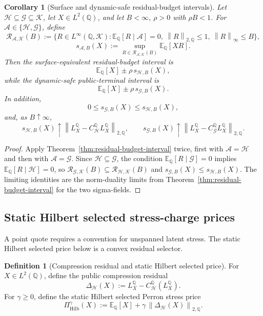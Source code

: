 \documentclass[11pt,a4paper]{amsart}
\theoremstyle{plain}
\newtheorem{corollary}[theorem]{Corollary}
\theoremstyle{definition}
\newtheorem{definition}[theorem]{Definition}
\theoremstyle{remark}
\newcommand{\QQ}{\mathbb{Q}}
\newcommand{\EE}{\mathbb{E}}
\newcommand{\cA}{\mathcal{A}}
\newcommand{\cG}{\mathcal{G}}
\newcommand{\cH}{\mathcal{H}}
\newcommand{\cK}{\mathcal{K}}
\newcommand{\cR}{\mathcal{R}}
\newcommand{\norm}[1]{\left\lVert #1\right\rVert}
\begin{document}
\begin{corollary}[Surface and dynamic-safe residual-budget intervals]\label{thm:nested-residual-budget-intervals}
Let \(\cH\subseteq\cG\subseteq\cK\), let \(X\in L^2(\QQ)\), and let \(B<\infty\), \(\rho>0\) with
\(\rho B<1\).  For \(\cA\in\{\cH,\cG\}\), define
\[
        \cR_{\cA,\cK}(B)
        :=
        \{R\in L^\infty(\QQ,\cK):
        \EE_\QQ[R\mid\cA]=0,\ 
        \norm{R}_{2,\QQ}\le1,\ 
        \norm{R}_\infty\le B\},
\]
\[
        s_{\cA,B}(X)
        :=
        \sup_{R\in\cR_{\cA,\cK}(B)}\EE_\QQ[XR].
\]
Then the surface-equivalent residual-budget interval is
\[
        \EE_\QQ[X]\pm \rho\,s_{\cH,B}(X),
\]
while the dynamic-safe public-terminal interval is
\[
        \EE_\QQ[X]\pm \rho\,s_{\cG,B}(X).
\]
In addition,
\[
        0\le s_{\cG,B}(X)\le s_{\cH,B}(X),
\]
and, as \(B\uparrow\infty\),
\[
        s_{\cH,B}(X)\uparrow
        \norm{L_X^\QQ-C_{\cH}^{\QQ}L_X^\QQ}_{2,\QQ},
        \qquad
        s_{\cG,B}(X)\uparrow
        \norm{L_X^\QQ-C_{\cG}^{\QQ}L_X^\QQ}_{2,\QQ}.
\]
\end{corollary}

\begin{proof}
Apply Theorem~\ref{thm:residual-budget-interval} twice, first with \(\cA=\cH\) and then with
\(\cA=\cG\).  Since \(\cH\subseteq\cG\), the condition \(\EE_\QQ[R\mid\cG]=0\) implies
\(\EE_\QQ[R\mid\cH]=0\), so \(\cR_{\cG,\cK}(B)\subseteq\cR_{\cH,\cK}(B)\) and
\(s_{\cG,B}(X)\le s_{\cH,B}(X)\).  The limiting identities are the norm-duality limits from
Theorem~\ref{thm:residual-budget-interval} for the two sigma-fields.
\end{proof}

\subsection{Static Hilbert selected stress-charge prices}

A point quote requires a convention for unspanned latent stress.  The static Hilbert selected
price below is a convex residual selector.

\begin{definition}[Compression residual and static Hilbert selected price]\label{def:hilbert-selected-price}
For \(X\in L^2(\QQ)\), define the public compression residual
\[
        \Delta_{\cH}(X)
        :=
        L_X^\QQ-C_{\cH}^{\QQ}(L_X^\QQ).
\]
For \(\gamma\ge0\), define the static Hilbert selected Perron stress price
\[
        \Pi_{\mathrm{Hilb}}^\gamma(X)
        :=
        \EE_\QQ[X]+\gamma\,\norm{\Delta_{\cH}(X)}_{2,\QQ}.
\]
\end{definition}
\end{document}
